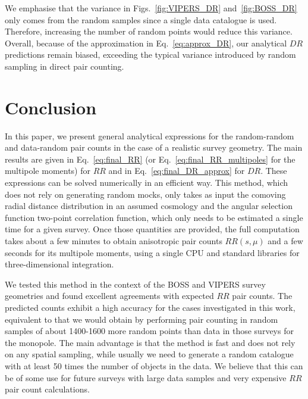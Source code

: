 \documentclass{aa}
\begin{document}
We emphasise that the variance in Figs.~\ref{fig:VIPERS_DR} and~\ref{fig:BOSS_DR} only comes from the random samples since a single data catalogue is used. Therefore, increasing the number of random points would reduce this variance. 
Overall, because of the approximation in Eq.~\eqref{eq:approx_DR}, our analytical $DR$ predictions remain biased, exceeding the typical variance introduced by random sampling in direct pair counting.

\section{Conclusion}
\label{sec:conclusion}

In this paper, we present general analytical expressions for the random-random and data-random pair counts in the case of a realistic survey geometry. The main results are given in Eq.~\eqref{eq:final_RR} (or Eq.~\ref{eq:final_RR_multipoles} for the multipole moments) for $RR$ and in Eq.~\eqref{eq:final_DR_approx} for $DR$. These expressions can be solved numerically in an efficient way. This method, which does not rely on generating random mocks, only takes as input the comoving radial distance distribution in an assumed cosmology and the angular selection function two-point correlation function, which only needs to be estimated a single time for a given survey. Once those quantities are provided, the full computation takes about a few minutes to obtain anisotropic pair counts $RR(s,\mu)$ and a few seconds for its multipole moments, using a single CPU and standard libraries for three-dimensional integration. 

We tested this method in the context of the BOSS and VIPERS survey geometries and found excellent agreements with expected $RR$ pair counts. The predicted counts exhibit a high accuracy for the cases investigated in this work, equivalent to that we would obtain by performing pair counting in random samples of about 1400-1600 more random points than data in those surveys for the monopole. The main advantage is that the method is fast and does not rely on any spatial sampling, while usually we need to generate a random catalogue with at least 50 times the number of objects in the data. We believe that this can be of some use for future surveys with large data samples and very expensive $RR$ pair count calculations.
\end{document}
